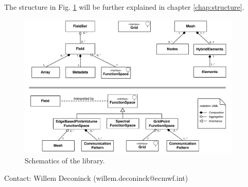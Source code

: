 The structure in Fig. \ref{fig:intro-schematics} will be further 
explained in chapter \ref{chap:structure}.
%
\begin{figure}[htb!]
  \centering
    \includegraphics[width=0.95\textwidth]{imgs/schematics.png}
    \caption{Schematics of the \Atlas library.}
    \label{fig:intro-schematics}
\end{figure}
%

Contact: Willem Deconinck (willem.deconinck@ecmwf.int)
